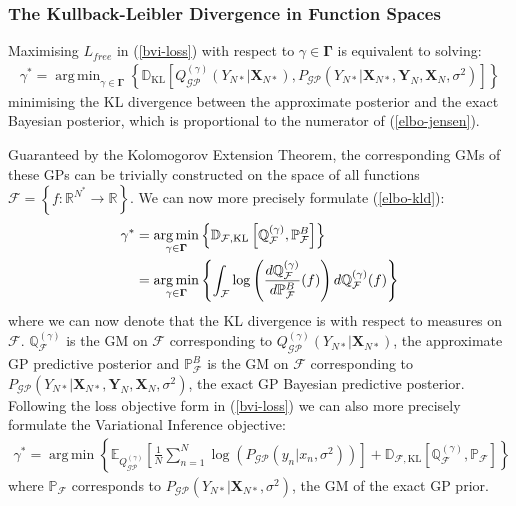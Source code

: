 \documentclass{article}
\newcommand{\KLD}{\operatorname{\mathbb{D}_{\text{KL}}}}
\newcommand{\GP}{\operatorname{\mathcal{GP}}}
\DeclareMathOperator*{\argmin}{arg\,min}
\numberwithin{equation}{section}
\begin{document}
\subsubsection{The Kullback-Leibler Divergence in Function Spaces}
Maximising $L_{free}$ in (\ref{bvi-loss}) with respect to $\gamma \in \mathbf{\Gamma}$ is equivalent to solving:
\begin{align}
    \gamma^* = \argmin_{\gamma \in \mathbf{\Gamma}} \left\{\KLD \left[ Q_{\GP}^{(\gamma)}\left(Y_{N*} \vert \mathbf{X}_{N*}\right) ,  P_{\GP}\left(Y_{N*} \vert \mathbf{X}_{N*}, \mathbf{Y}_N, \mathbf{X}_N, \sigma^2 \right) \right]\right\}
    \label{elbo-kld}
\end{align}
minimising the KL divergence between the approximate posterior and the exact Bayesian posterior, which is proportional to the numerator of (\ref{elbo-jensen}). 

Guaranteed by the Kolomogorov Extension Theorem, the corresponding GMs of these GPs can be trivially constructed on the space of all functions $\mathcal{F} = \left\{f: \mathbb{R}^{N^*} \rightarrow \mathbb{R} \right\}$. We can now more precisely formulate (\ref{elbo-kld}):
\begin{align}
    \label{kld-function-spaces}
    \gamma^* &=\argmin_{\gamma \in \mathbf{\Gamma}}  \left\{ \mathbb{D}_{\mathcal{F}, \text{\text{KL}}}\left[ \mathbb{Q}^{(\gamma)}_\mathcal{F},  \mathbb{P}^B_\mathcal{F}\right] \right\} \\
    &= \argmin_{\gamma \in \mathbf{\Gamma}} \left\{\int_{\mathcal{F}} \log \left( \frac{d \mathbb{Q}^{(\gamma)}_\mathcal{F}}{d \mathbb{P}^B_\mathcal{F}} (f)\right)d \mathbb{Q}^{(\gamma)}_\mathcal{F}(f) \right\}
    \label{radon-nikodym}
\end{align}
where we can now denote that the KL divergence is with respect to measures on $\mathcal{F}$. $\mathbb{Q}^{(\gamma)}_\mathcal{F}$ is the GM on $\mathcal{F}$ corresponding to $Q_{\GP}^{(\gamma)}\left(Y_{N*} \vert \mathbf{X}_{N*}\right)$, the approximate GP predictive posterior and $\mathbb{P}^B_\mathcal{F}$ is the GM on $\mathcal{F}$ corresponding to $P_{\GP}\left(Y_{N*} \vert \mathbf{X}_{N*}, \mathbf{Y}_N, \mathbf{X}_N, \sigma^2 \right)$, the exact GP Bayesian predictive posterior. Following the loss objective form in (\ref{bvi-loss}) we can also more precisely formulate the Variational Inference objective:
\begin{align}
    \gamma^* = \argmin \left\{ \mathbb{E}_{Q^{(\gamma)}_{\GP}}\left[\frac{1}{N}\sum_{n=1}^N\log \left(P_{\GP}\left(y_n \vert x_n, \sigma^2\right)\right)\right] + \mathbb{D}_{\mathcal{F}, \text{KL}} \left[\mathbb{Q}^{(\gamma)}_{\mathcal{F}}, \mathbb{P}_{\mathcal{F}} \right] \right\}
    \label{bvi-gm-loss}
\end{align}
where $\mathbb{P}_\mathcal{F}$ corresponds to $P_{\GP}\left(Y_{N*} \vert \mathbf{X}_{N*}, \sigma^2 \right)$, the GM of the exact GP prior.
\end{document}
